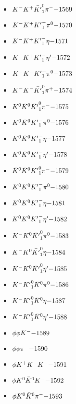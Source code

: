 \begin{multicols}{3}
\begin{itemize}
 \item $ K^{-} K^{+} \bar{{K^{\prime}}}_{1}^{0} \pi^{-} \hfill{-1569}$
 \item $ K^{-} K^{+} {K^{\prime}}_{1}^{-} \pi^{0} \hfill{-1570}$
 \item $ K^{-} K^{+} {K^{\prime}}_{1}^{-} \eta \hfill{-1571}$
 \item $ K^{-} K^{+} {K^{\prime}}_{1}^{-} {\eta^{\prime}} \hfill{-1572}$
 \item $ K^{-} K^{-} {K^{\prime}}_{1}^{+} \pi^{0} \hfill{-1573}$
 \item $ K^{-} K^{-} \bar{{K^{\prime}}}_{1}^{0} \pi^{+} \hfill{-1574}$
 \item $ K^{0} \bar{K}^{0} \bar{{K^{\prime}}}_{1}^{0} \pi^{-} \hfill{-1575}$
 \item $ K^{0} \bar{K}^{0} {K^{\prime}}_{1}^{-} \pi^{0} \hfill{-1576}$
 \item $ K^{0} \bar{K}^{0} {K^{\prime}}_{1}^{-} \eta \hfill{-1577}$
 \item $ K^{0} \bar{K}^{0} {K^{\prime}}_{1}^{-} {\eta^{\prime}} \hfill{-1578}$
 \item $ \bar{K}^{0} \bar{K}^{0} {K^{\prime}}_{1}^{0} \pi^{-} \hfill{-1579}$
 \item $ K^{0} K^{0} {K^{\prime}}_{1}^{-} \pi^{0} \hfill{-1580}$
 \item $ K^{0} K^{0} {K^{\prime}}_{1}^{-} \eta \hfill{-1581}$
 \item $ K^{0} K^{0} {K^{\prime}}_{1}^{-} {\eta^{\prime}} \hfill{-1582}$
 \item $ K^{-} K^{0} \bar{{K^{\prime}}}_{1}^{0} \pi^{0} \hfill{-1583}$
 \item $ K^{-} K^{0} \bar{{K^{\prime}}}_{1}^{0} \eta \hfill{-1584}$
 \item $ K^{-} K^{0} \bar{{K^{\prime}}}_{1}^{0} {\eta^{\prime}} \hfill{-1585}$
 \item $ K^{-} {K^{\prime}}_{1}^{0} \bar{K}^{0} \pi^{0} \hfill{-1586}$
 \item $ K^{-} {K^{\prime}}_{1}^{0} \bar{K}^{0} \eta \hfill{-1587}$
 \item $ K^{-} {K^{\prime}}_{1}^{0} \bar{K}^{0} {\eta^{\prime}} \hfill{-1588}$
 \item $ \phi \phi K^{-} \hfill{-1589}$
 \item $ \phi \phi \pi^{-} \hfill{-1590}$
 \item $ \phi K^{+} K^{-} K^{-} \hfill{-1591}$
 \item $ \phi K^{0} \bar{K}^{0} K^{-} \hfill{-1592}$
 \item $ \phi K^{0} \bar{K}^{0} \pi^{-} \hfill{-1593}$

\end{itemize}
\end{multicols}
